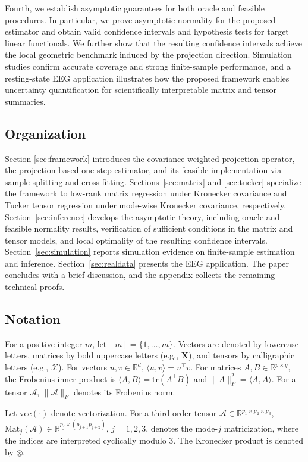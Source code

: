 \documentclass[authoryear,preprint,review,12pt]{elsarticle}
\begin{document}
	Fourth, we establish asymptotic guarantees for both oracle and feasible procedures. In particular, we prove asymptotic normality for the proposed estimator and obtain valid confidence intervals and hypothesis tests for target linear functionals. We further show that the resulting confidence intervals achieve the local geometric benchmark induced by the projection direction. Simulation studies confirm accurate coverage and strong finite-sample performance, and a resting-state EEG application illustrates how the proposed framework enables uncertainty quantification for scientifically interpretable matrix and tensor summaries. 
	 
	
	\subsection{Organization}
	Section \ref{sec:framework} introduces the covariance-weighted projection operator, the projection-based one-step estimator, and its feasible implementation via sample splitting and cross-fitting.
	Sections~\ref{sec:matrix} and \ref{sec:tucker} specialize the framework to low-rank matrix regression under Kronecker covariance and Tucker tensor regression under mode-wise Kronecker covariance, respectively.
	Section~\ref{sec:inference} develops the asymptotic theory, including oracle and feasible normality results, verification of sufficient conditions in the matrix and tensor models, and local optimality of the resulting confidence intervals.
	Section~\ref{sec:simulation} reports simulation evidence on finite-sample estimation and inference.
	Section~\ref{sec:realdata} presents the EEG application.
	The paper concludes with a brief discussion, and the appendix collects the remaining technical proofs.
	
	\subsection{Notation}\label{sec:notation}
	For a positive integer $m$, let $[m]=\{1,\ldots,m\}$.
	Vectors are denoted by lowercase letters, matrices by bold uppercase letters (e.g., $\mathbf{X}$),
	and tensors by calligraphic letters (e.g., $\mathcal{X}$).
	For vectors $u,v\in\mathbb{R}^d$, $\langle u,v\rangle=u^\top v$.
	For matrices $A,B\in\mathbb{R}^{p\times q}$, the Frobenius inner product is
	$\langle A,B\rangle=\mathrm{tr}(A^\top B)$ and $\|A\|_F^2=\langle A,A\rangle$.
	For a tensor $\mathcal{A}$, $\|\mathcal{A}\|_F$ denotes its Frobenius norm.
	
	Let $\mathrm{vec}(\cdot)$ denote vectorization.
	For a third-order tensor $\mathcal{A}\in\mathbb{R}^{p_1\times p_2\times p_3}$,
	$\mathrm{Mat}_j(\mathcal{A})\in\mathbb{R}^{p_j\times (p_{j+1}p_{j+2})}$, $j=1,2,3$, denotes the mode-$j$
	matricization, where the indices are interpreted cyclically modulo $3$.
	The Kronecker product is denoted by $\otimes$.
	
\end{document}
